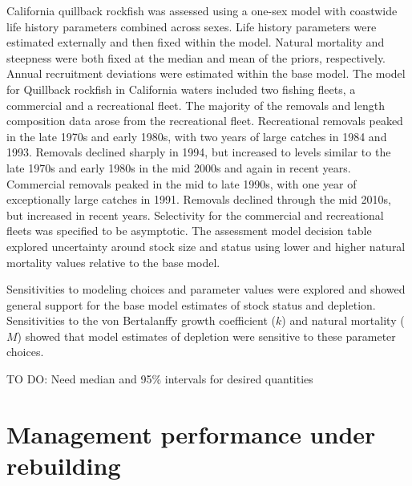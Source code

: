\documentclass[11pt,
  english,
  a4paper,
]{article}
\begin{document}
California quillback rockfish was assessed using a one-sex model with coastwide life history parameters combined across sexes. Life history parameters were estimated externally and then fixed within the model. Natural mortality and steepness were both fixed at the median and mean of the priors, respectively. Annual recruitment deviations were estimated within the base model. The model for Quillback rockfish in California waters included two fishing fleets, a commercial and a recreational fleet. The majority of the removals and length composition data arose from the recreational fleet. Recreational removals peaked in the late 1970s and early 1980s, with two years of large catches in 1984 and 1993. Removals declined sharply in 1994, but increased to levels similar to the late 1970s and early 1980s in the mid 2000s and again in recent years. Commercial removals peaked in the mid to late 1990s, with one year of exceptionally large catches in 1991. Removals declined through the mid 2010s, but increased in recent years. Selectivity for the commercial and recreational fleets was specified to be asymptotic. The assessment model decision table explored uncertainty around stock size and status using lower and higher natural mortality values relative to the base model.

\leavevmode\tagmcend\tagstructend\par


Sensitivities to modeling choices and parameter values were explored and showed general support for the base model estimates of stock status and depletion. Sensitivities to the von Bertalanffy growth coefficient ({\(k\)\leavevmode\tagmcend\tagstructend}) and natural mortality ({\(M\)\leavevmode\tagmcend\tagstructend}) showed that model estimates of depletion were sensitive to these parameter choices.

\leavevmode\tagmcend\tagstructend\par


TO DO: Need median and 95\% intervals for desired quantities

\leavevmode\tagmcend\tagstructend\par


\hypertarget{management-performance-under-rebuilding}{%
\section{Management performance under rebuilding}\label{management-performance-under-rebuilding}}
\end{document}

